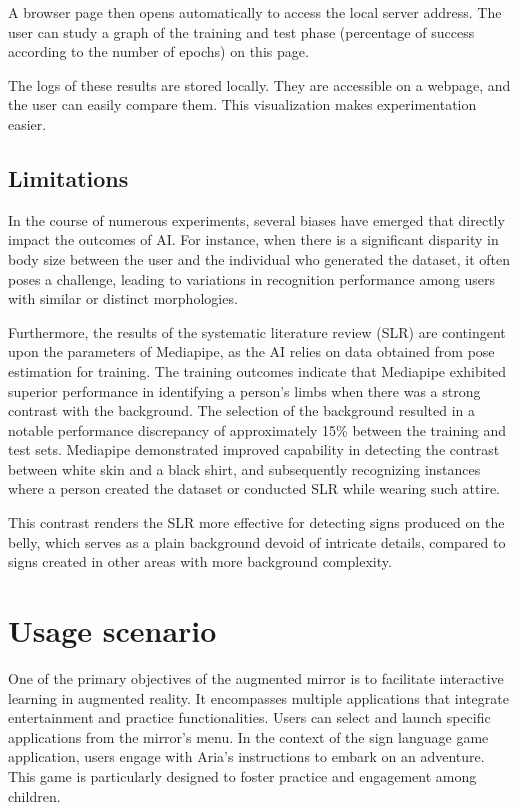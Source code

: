 A browser page then opens automatically to access the local server address. The user can study a graph of the training and test phase (percentage of success according to the number of epochs) on this page. 

The logs of these results are stored locally. They are accessible on a webpage, and the user can easily compare them. This visualization makes experimentation easier.

\subsection{Limitations}

In the course of numerous experiments, several biases have emerged that directly impact the outcomes of AI. For instance, when there is a significant disparity in body size between the user and the individual who generated the dataset, it often poses a challenge, leading to variations in recognition performance among users with similar or distinct morphologies.

Furthermore, the results of the systematic literature review (SLR) are contingent upon the parameters of Mediapipe, as the AI relies on data obtained from pose estimation for training. The training outcomes indicate that Mediapipe exhibited superior performance in identifying a person's limbs when there was a strong contrast with the background. The selection of the background resulted in a notable performance discrepancy of approximately 15\% between the training and test sets. Mediapipe demonstrated improved capability in detecting the contrast between white skin and a black shirt, and subsequently recognizing instances where a person created the dataset or conducted SLR while wearing such attire.

This contrast renders the SLR more effective for detecting signs produced on the belly, which serves as a plain background devoid of intricate details, compared to signs created in other areas with more background complexity.

\section{Usage scenario}

One of the primary objectives of the augmented mirror is to facilitate interactive learning in augmented reality. It encompasses multiple applications that integrate entertainment and practice functionalities. Users can select and launch specific applications from the mirror's menu. In the context of the sign language game application, users engage with Aria's instructions to embark on an adventure. This game is particularly designed to foster practice and engagement among children.

